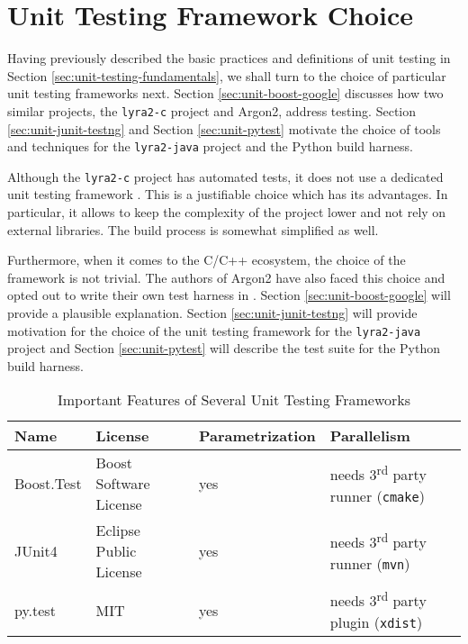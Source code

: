 \chapter{Unit Testing Framework Choice}
\label{sec:unit-testing-framework-choice}

Having previously described the basic practices and definitions of unit testing in Section \ref{sec:unit-testing-fundamentals}, we shall turn to the choice of particular unit testing frameworks next. Section \ref{sec:unit-boost-google} discusses how two similar projects, the \texttt{lyra2-c} project and Argon2, address testing. Section \ref{sec:unit-junit-testng} and Section \ref{sec:unit-pytest} motivate the choice of tools and techniques for the \texttt{lyra2-java} project and the Python build harness.

Although the \texttt{lyra2-c} project has automated tests, it does not use a dedicated unit testing framework \cite{github:2017:lyra}. This is a justifiable choice which has its advantages. In particular, it allows to keep the complexity of the project lower and not rely on external libraries. The build process is somewhat simplified as well.

Furthermore, when it comes to the C/C++ ecosystem, the choice of the framework is not trivial. The authors of Argon2 have also faced this choice and opted out to write their own test harness in \cite{github:2017:argon2-test.c}. Section \ref{sec:unit-boost-google} will provide a plausible explanation. Section \ref{sec:unit-junit-testng} will provide motivation for the choice of the unit testing framework for the \texttt{lyra2-java} project and Section \ref{sec:unit-pytest} will describe the test suite for the Python build harness.

\begin{table}
\begin{tabular}{llll}
    Name & License & Parametrization & Parallelism \\ \hline
Boost.Test & Boost Software License & yes & needs 3\textsuperscript{rd} party runner (\texttt{cmake}) \\
JUnit4 & Eclipse Public License & yes & needs 3\textsuperscript{rd} party runner (\texttt{mvn}) \\
py.test & MIT & yes & needs 3\textsuperscript{rd} party plugin (\texttt{xdist})
\end{tabular}
\caption{Important Features of Several Unit Testing Frameworks}
\label{table:framework-features-cpp}
\end{table}


